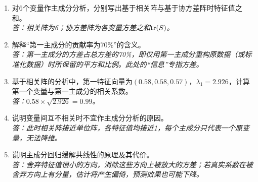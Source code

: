 \begin{fuxi}[复习题]
\begin{enumerate}
\item 对6个变量作主成分分析，分别写出基于相关阵与基于协方差阵时特征值之和。\\
\textit{答：相关阵为6；协方差阵为各变量方差之和$\operatorname{tr}(S)$。}
\item 解释“第一主成分的贡献率为70\%”的含义。\\
\textit{答：第一主成分的方差占总方差的70\%，即仅用第一主成分重构原数据（或标准化数据）时所保留的平方和比例。此处的“信息”专指方差。}
\item 基于相关阵的分析中，第一特征向量为$(0.58,0.58,0.57)$，$\lambda_1=2.926$，计算第一个变量与第一主成分的相关系数。\\
\textit{答：$0.58\times\sqrt{2.926}=0.99$。}
\item 说明变量间互不相关时不宜作主成分分析的原因。\\
\textit{答：此时相关阵接近单位阵，各特征值均接近1，每个主成分只代表一个原变量，无法降维。}
\item 说明主成分回归缓解共线性的原理及其代价。\\
\textit{答：舍弃特征值很小的方向，消除这些方向上被放大的方差；若真实系数在被舍弃方向上有分量，估计将产生偏倚，预测效果也可能下降。}
\end{enumerate}
\end{fuxi}
